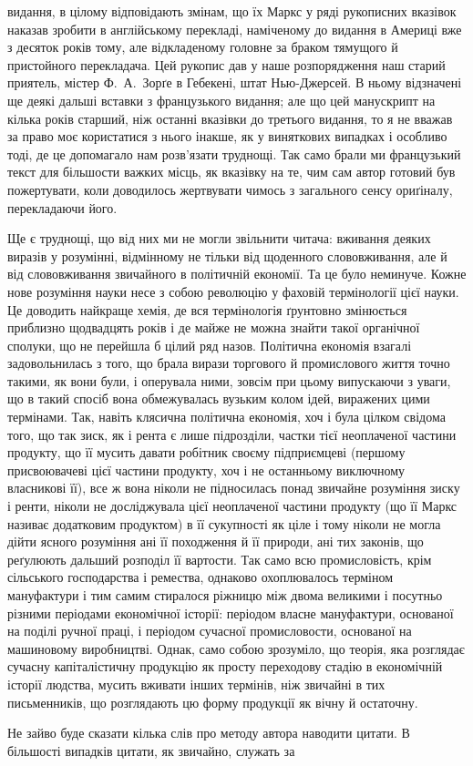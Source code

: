 \parcont{}  %
видання, в цілому відповідають змінам, що їх Маркс у ряді рукописних
вказівок наказав зробити в англійському перекладі, наміченому
до видання в Америці вже з десяток років тому, але відкладеному
головне за браком тямущого й пристойного перекладача.
Цей рукопис дав у наше розпорядження наш старий приятель,
містер Ф.~А.~Зорґе в Гебекені, штат Нью-Джерсей. В ньому
відзначені ще деякі дальші вставки з французького видання;
але що цей манускрипт на кілька років старший, ніж останні вказівки
до третього видання, то я не вважав за право моє користатися
з нього інакше, як у виняткових випадках і особливо тоді,
де це допомагало нам розв’язати труднощі. Так само брали ми
французький текст для більшости важких місць, як вказівку на те,
чим сам автор готовий був пожертувати, коли доводилось жертвувати
чимось з загального сенсу ориґіналу, перекладаючи його.
\enablefootnotebreak{}

Ще є труднощі, що від них ми не могли звільнити читача: вживання
деяких виразів у розумінні, відмінному не тільки від щоденного
слововживання, але й від слововживання звичайного в
політичній економії. Та це було неминуче. Кожне нове розуміння
науки несе з собою революцію у фаховій термінології цієї науки.
Це доводить найкраще хемія, де вся термінологія ґрунтовно змінюється
приблизно щодвадцять років і де майже не можна знайти
такої органічної сполуки, що не перейшла б цілий ряд назов.
Політична економія взагалі задовольнилась з того, що брала
вирази торгового й промислового життя точно такими, як вони
були, і оперувала ними, зовсім при цьому випускаючи з уваги, що
в такий спосіб вона обмежувалась вузьким колом ідей, виражених
цими термінами. Так, навіть клясична політична економія, хоч
і була цілком свідома того, що так зиск, як і рента є лише підрозділи,
частки тієї неоплаченої частини продукту, що її мусить
давати робітник своєму підприємцеві (першому присвоювачеві
цієї частини продукту, хоч і не останньому виключному власникові
її), все ж вона ніколи не підносилась понад звичайне розуміння
зиску і ренти, ніколи не досліджувала цієї неоплаченої
частини продукту (що її Маркс називає додатковим продуктом)
в її сукупності як ціле і тому ніколи не могла дійти ясного розуміння
ані її походження й її природи, ані тих законів, що реґулюють
дальший розподіл її вартости. Так само всю промисловість,
крім сільського господарства і ремества, однаково охоплювалось
терміном мануфактури і тим самим стиралося ріжницю між двома
великими і посутньо різними періодами економічної історії: періодом
власне мануфактури, основаної на поділі ручної праці,
і періодом сучасної промисловости, основаної на машиновому
виробництві. Однак, само собою зрозуміло, що теорія, яка розглядає
сучасну капіталістичну продукцію як просту переходову
стадію в економічній історії людства, мусить вживати інших
термінів, ніж звичайні в тих письменників, що розглядають цю
форму продукції як вічну й остаточну.

Не зайво буде сказати кілька слів про методу автора наводити
цитати. В більшості випадків цитати, як звичайно, служать за
\parbreak{}  %
